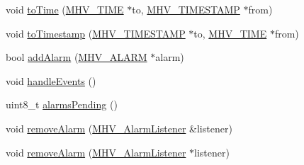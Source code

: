\begin{DoxyCompactItemize}
\item 
void \hyperlink{class_m_h_v___r_t_c_af8e273e8cc911c8f355299416e7a7db2}{to\-Time} (\hyperlink{_m_h_v___r_t_c_8h_adace8912943ac21c837360427880df71}{\-M\-H\-V\-\_\-\-T\-I\-M\-E} $\ast$to, \hyperlink{_m_h_v___r_t_c_8h_a1e30d3a92b1b868286bd0d619245d8a6}{\-M\-H\-V\-\_\-\-T\-I\-M\-E\-S\-T\-A\-M\-P} $\ast$from)
\item 
void \hyperlink{class_m_h_v___r_t_c_aaaf020893b6a5bd81f08371cd804a68b}{to\-Timestamp} (\hyperlink{_m_h_v___r_t_c_8h_a1e30d3a92b1b868286bd0d619245d8a6}{\-M\-H\-V\-\_\-\-T\-I\-M\-E\-S\-T\-A\-M\-P} $\ast$to, \hyperlink{_m_h_v___r_t_c_8h_adace8912943ac21c837360427880df71}{\-M\-H\-V\-\_\-\-T\-I\-M\-E} $\ast$from)
\item 
bool \hyperlink{class_m_h_v___r_t_c_a2d58b554a2ff0eb2cf9f7fccc29e5738}{add\-Alarm} (\hyperlink{_m_h_v___r_t_c_8h_af13307658f41fba330ffae04dd5cbce6}{\-M\-H\-V\-\_\-\-A\-L\-A\-R\-M} $\ast$alarm)
\item 
void \hyperlink{class_m_h_v___r_t_c_abebdf394ea6ed2c48f80cc02d4371a90}{handle\-Events} ()
\item 
uint8\-\_\-t \hyperlink{class_m_h_v___r_t_c_a78c9916568b91c43ba000a8fa851e3e5}{alarms\-Pending} ()
\item 
void \hyperlink{class_m_h_v___r_t_c_a102c6e3d254e884d586ef3b9b885058b}{remove\-Alarm} (\hyperlink{class_m_h_v___alarm_listener}{\-M\-H\-V\-\_\-\-Alarm\-Listener} \&listener)
\item 
void \hyperlink{class_m_h_v___r_t_c_ad567f1efa0e4e108699d0895debc40dd}{remove\-Alarm} (\hyperlink{class_m_h_v___alarm_listener}{\-M\-H\-V\-\_\-\-Alarm\-Listener} $\ast$listener)
\end{DoxyCompactItemize}
